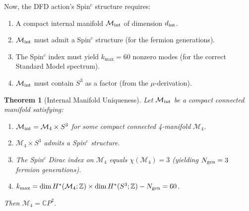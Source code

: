 \documentclass[11pt]{article}
\newtheorem{theorem}{Theorem}
\begin{document}
Now, the DFD action's Spin$^c$ structure requires:
\begin{enumerate}
\item A compact internal manifold $\mathcal{M}_{\rm int}$ of dimension $d_{\rm int}$.
\item $\mathcal{M}_{\rm int}$ must admit a Spin$^c$ structure (for the fermion generations).
\item The Spin$^c$ index must yield $k_{\max} = 60$ nonzero modes (for the correct Standard Model spectrum).
\item $\mathcal{M}_{\rm int}$ must contain $S^3$ as a factor (from the $\mu$-derivation).
\end{enumerate}

\begin{theorem}[Internal Manifold Uniqueness]
Let $\mathcal{M}_{\rm int}$ be a compact connected manifold satisfying:
\begin{enumerate}
\item $\mathcal{M}_{\rm int} = \mathcal{M}_4 \times S^3$ for some compact connected 4-manifold $\mathcal{M}_4$.
\item $\mathcal{M}_4 \times S^3$ admits a Spin$^c$ structure.
\item The Spin$^c$ Dirac index on $\mathcal{M}_4$ equals $\chi(\mathcal{M}_4) = 3$ (yielding $N_{\rm gen} = 3$ fermion generations).
\item $k_{\max} = \dim H^*(\mathcal{M}_4; \mathbb{Z}) \times \dim H^*(S^3; \mathbb{Z}) - N_{\rm gen} = 60$.
\end{enumerate}
Then $\mathcal{M}_4 = \mathbb{C}P^2$.
\end{theorem}
\end{document}
